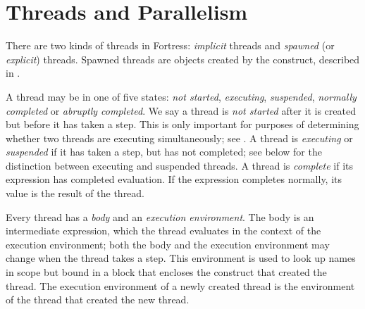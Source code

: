 %
%
%
%

\section{Threads and Parallelism}


There are two kinds of threads in Fortress:
\emph{implicit} threads and \emph{spawned}  (or \emph{explicit}) threads.
Spawned threads are objects created by the  construct,
described in .

A thread may be in one of five states: \emph{not started},
\emph{executing}, \emph{suspended}, \emph{normally completed} or
\emph{abruptly completed}.  We say a thread is \emph{not started}
after it is created but before it has taken a step.  This is only
important for purposes of determining whether two threads are
executing simultaneously; see .  A thread is
\emph{executing} or \emph{suspended} if it has taken a step, but has
not completed; see below for the distinction between executing and
suspended threads.  A thread is \emph{complete} if its expression has
completed evaluation.  If the expression completes normally, its value
is the result of the thread.

Every thread has a \emph{body} and an \emph{execution environment}.
The body is an intermediate expression, which the thread evaluates in
the context of the execution environment; both the body and the
execution environment may change when the thread takes a step.  This
environment is used to look up names in scope but bound in a block
that encloses the construct that created the thread.  The execution
environment of a newly created thread is the environment of the thread
that created the new thread.

